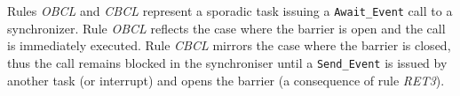 Rules \emph{OBCL} and \emph{CBCL} represent a sporadic
task issuing a \texttt{Await\_Event} call to a synchronizer. Rule
\emph{OBCL} reflects the case where the barrier is open and the call
is immediately executed. Rule \emph{CBCL} mirrors the case where 
the barrier is closed, thus the call remains blocked in the synchroniser 
until a \texttt{Send\_Event} is issued by another task (or interrupt)
and opens the barrier (a consequence of rule \emph{RET3}).



